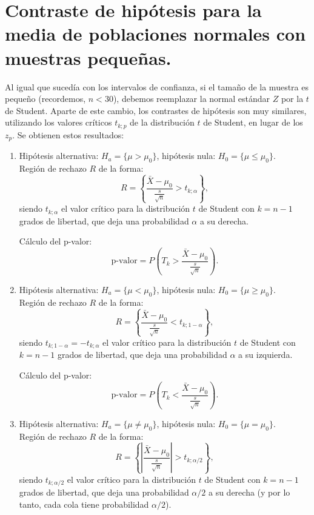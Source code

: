\section{Contraste de hipótesis para la media de poblaciones normales con muestras pequeñas.}
\label{cap07:sec:contrasteHipotesisMediaMuestrasPequennas}

Al igual que sucedía con los intervalos de confianza, si el tamaño de la muestra es pequeño (recordemos, $n<30$), debemos reemplazar la normal estándar $Z$ por la $t$ de Student. Aparte de este cambio, los contrastes de hipótesis son muy similares, utilizando los valores críticos $t_{k;p}$ de la distribución $t$ de Student, en lugar de los $z_p$. Se obtienen estos resultados:
\begin{enumerate}
    \item Hipótesis alternativa: $H_a=\{\mu>\mu_0\}$, hipótesis nula: $H_0=\{\mu\leq \mu_0\}$.\\[3mm]
            Región de rechazo $R$ de la forma:
            \[R=\left\{\dfrac{\bar X-\mu_0}{\frac{s}{\sqrt{n}}}>t_{k;\alpha}\right\},\]
            siendo $t_{k;\alpha}$ el valor crítico para la distribución $t$ de Student con $k=n-1$ grados de libertad, que deja una probabilidad $\alpha$ a su derecha.

            Cálculo del p-valor:
            \begin{equation}\label{cap07:ecu:pValorMediaStudentColaIzquierda}
            \mbox{p-valor}=
            P\left(T_k > \dfrac{\bar X-\mu_0}{\frac{s}{\sqrt{n}}}\right).
            \end{equation}


    \item Hipótesis alternativa: $H_a=\{\mu<\mu_0\}$, hipótesis nula: $H_0=\{\mu\geq \mu_0\}$.\\[3mm]
            Región de rechazo $R$ de la forma:
            \[R=\left\{\dfrac{\bar X-\mu_0}{\frac{s}{\sqrt{n}}}<t_{k;1-\alpha}\right\},\]
            siendo $t_{k;1-\alpha}=-t_{k;\alpha}$ el valor crítico para la distribución $t$ de Student con $k=n-1$ grados de libertad, que deja una probabilidad $\alpha$ a su izquierda.

            Cálculo del p-valor:
            \begin{equation}\label{cap07:ecu:pValorMediaStudentColaIzquierda}
            \mbox{p-valor}=
            P\left(T_k < \dfrac{\bar X-\mu_0}{\frac{s}{\sqrt{n}}}\right).
            \end{equation}


    \item Hipótesis alternativa: $H_a=\{\mu\neq\mu_0\}$, hipótesis nula: $H_0=\{\mu=\mu_0\}$.\\[3mm]
            Región de rechazo $R$ de la forma:
        \[R=\left\{\left|\dfrac{\bar X-\mu_0}{\frac{s}{\sqrt{n}}}\right|>t_{k;\alpha/2}\right\},\]
        siendo $t_{k;\alpha/2}$ el valor crítico para la distribución $t$ de Student con $k=n-1$ grados de libertad, que deja una probabilidad $\alpha/2$ a su derecha (y por lo tanto, cada cola tiene probabilidad $\alpha/2$).


\end{enumerate}
